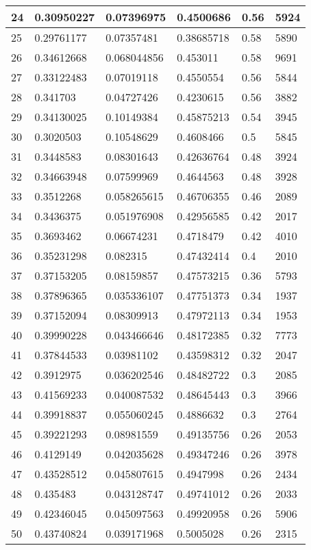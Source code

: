 \begin{longtable}{|l|l|l|l|l|l|}
24 & 0.30950227 & 0.07396975 & 0.4500686 & 0.56 & 5924 \\ \hline 
25 & 0.29761177 & 0.07357481 & 0.38685718 & 0.58 & 5890 \\ \hline 
26 & 0.34612668 & 0.068044856 & 0.453011 & 0.58 & 9691 \\ \hline 
27 & 0.33122483 & 0.07019118 & 0.4550554 & 0.56 & 5844 \\ \hline 
28 & 0.341703 & 0.04727426 & 0.4230615 & 0.56 & 3882 \\ \hline 
29 & 0.34130025 & 0.10149384 & 0.45875213 & 0.54 & 3945 \\ \hline 
30 & 0.3020503 & 0.10548629 & 0.4608466 & 0.5 & 5845 \\ \hline 
31 & 0.3448583 & 0.08301643 & 0.42636764 & 0.48 & 3924 \\ \hline 
32 & 0.34663948 & 0.07599969 & 0.4644563 & 0.48 & 3928 \\ \hline 
33 & 0.3512268 & 0.058265615 & 0.46706355 & 0.46 & 2089 \\ \hline 
34 & 0.3436375 & 0.051976908 & 0.42956585 & 0.42 & 2017 \\ \hline 
35 & 0.3693462 & 0.06674231 & 0.4718479 & 0.42 & 4010 \\ \hline 
36 & 0.35231298 & 0.082315 & 0.47432414 & 0.4 & 2010 \\ \hline 
37 & 0.37153205 & 0.08159857 & 0.47573215 & 0.36 & 5793 \\ \hline 
38 & 0.37896365 & 0.035336107 & 0.47751373 & 0.34 & 1937 \\ \hline 
39 & 0.37152094 & 0.08309913 & 0.47972113 & 0.34 & 1953 \\ \hline 
40 & 0.39990228 & 0.043466646 & 0.48172385 & 0.32 & 7773 \\ \hline 
41 & 0.37844533 & 0.03981102 & 0.43598312 & 0.32 & 2047 \\ \hline 
42 & 0.3912975 & 0.036202546 & 0.48482722 & 0.3 & 2085 \\ \hline 
43 & 0.41569233 & 0.040087532 & 0.48645443 & 0.3 & 3966 \\ \hline 
44 & 0.39918837 & 0.055060245 & 0.4886632 & 0.3 & 2764 \\ \hline 
45 & 0.39221293 & 0.08981559 & 0.49135756 & 0.26 & 2053 \\ \hline 
46 & 0.4129149 & 0.042035628 & 0.49347246 & 0.26 & 3978 \\ \hline 
47 & 0.43528512 & 0.045807615 & 0.4947998 & 0.26 & 2434 \\ \hline 
48 & 0.435483 & 0.043128747 & 0.49741012 & 0.26 & 2033 \\ \hline 
49 & 0.42346045 & 0.045097563 & 0.49920958 & 0.26 & 5906 \\ \hline 
50 & 0.43740824 & 0.039171968 & 0.5005028 & 0.26 & 2315 \\ \hline 
\end{longtable}
